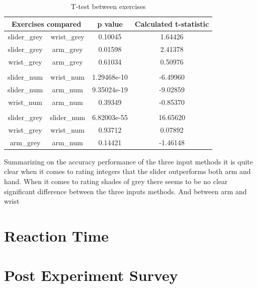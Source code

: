 \begin{table}[]
\centering
\begin{tabular}{cccc}
\multicolumn{2}{c}{Exercises compared} & p value & Calculated t-statistic \\ \hline
\multicolumn{1}{|c|}{slider\_grey} & \multicolumn{1}{c|}{wrist\_grey} & \multicolumn{1}{c|}{0.10045} & \multicolumn{1}{c|}{1.64426} \\ \hline
\multicolumn{1}{|c|}{slider\_grey} & \multicolumn{1}{c|}{arm\_grey} & \multicolumn{1}{c|}{0.01598} & \multicolumn{1}{c|}{2.41378} \\ \hline
\multicolumn{1}{|c|}{wrist\_grey} & \multicolumn{1}{c|}{arm\_grey} & \multicolumn{1}{c|}{0.61034} & \multicolumn{1}{c|}{0.50976} \\ \hline
\multicolumn{1}{l}{} & \multicolumn{1}{l}{} & \multicolumn{1}{l}{} & \multicolumn{1}{l}{} \\ \hline
\multicolumn{1}{|c|}{slider\_num} & \multicolumn{1}{c|}{wrist\_num} & \multicolumn{1}{c|}{1.29468e-10} & \multicolumn{1}{c|}{-6.49960} \\ \hline
\multicolumn{1}{|c|}{slider\_num} & \multicolumn{1}{c|}{arm\_num} & \multicolumn{1}{c|}{9.35024e-19} & \multicolumn{1}{c|}{-9.02859} \\ \hline
\multicolumn{1}{|c|}{wrist\_num} & \multicolumn{1}{c|}{arm\_num} & \multicolumn{1}{c|}{0.39349} & \multicolumn{1}{c|}{-0.85370} \\ \hline
\multicolumn{1}{l}{} & \multicolumn{1}{l}{} & \multicolumn{1}{l}{} & \multicolumn{1}{l}{} \\ \hline
\multicolumn{1}{|c|}{slider\_grey} & \multicolumn{1}{c|}{slider\_num} & \multicolumn{1}{c|}{6.82003e-55} & \multicolumn{1}{c|}{16.65620} \\ \hline
\multicolumn{1}{|c|}{wrist\_grey} & \multicolumn{1}{c|}{wrist\_num} & \multicolumn{1}{c|}{0.93712} & \multicolumn{1}{c|}{0.07892} \\ \hline
\multicolumn{1}{|c|}{arm\_grey} & \multicolumn{1}{c|}{arm\_num} & \multicolumn{1}{c|}{0.14421} & \multicolumn{1}{c|}{-1.46148} \\ \hline
\end{tabular}
\caption{T-test between exercises}
\label{ttest}
\end{table}

Summarizing on the accuracy performance of the three input methods it is quite clear when it comes to rating integers that the slider outperforms both arm and hand. When it comes to rating shades of grey there seems to be no clear significant difference between the three inputs methods. And between arm and wrist 

\section{Reaction Time}

\section{Post Experiment Survey}